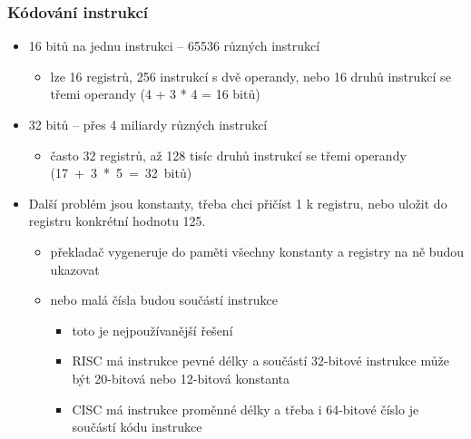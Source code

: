 \documentclass{beamer}
\begin{document}
\begin{frame}
\frametitle{Kódování instrukcí}

\begin{itemize}
\item 16 bitů na jednu instrukci -- 65536 různých instrukcí
\begin{itemize}
\item lze 16 registrů, 256 instrukcí s dvě operandy, nebo 16 druhů instrukcí se třemi operandy (4 + 3 * 4 = 16 bitů)
\end{itemize}
\item 32 bitů -- přes 4 miliardy různých instrukcí 
\begin{itemize}
\item často 32 registrů, až 128 tisíc druhů instrukcí se třemi operandy (17~+~3~*~5~=~32~bitů)
\end{itemize}
\item Další problém jsou konstanty, třeba chci přičíst 1 k registru, nebo uložit do registru konkrétní hodnotu 125. 
\begin{itemize}
\item překladač vygeneruje do paměti všechny konstanty a registry na ně budou ukazovat
\item nebo malá čísla budou součástí instrukce
\begin{itemize}
\item toto je nejpoužívanější řešení
\item RISC má instrukce pevné délky a součástí 32-bitové instrukce může být 20-bitová nebo 12-bitová konstanta
\item CISC má instrukce proměnné délky a třeba i 64-bitové číslo je součástí kódu instrukce
\end{itemize}
\end{itemize}
\end{itemize}
\end{frame}
\end{document}
